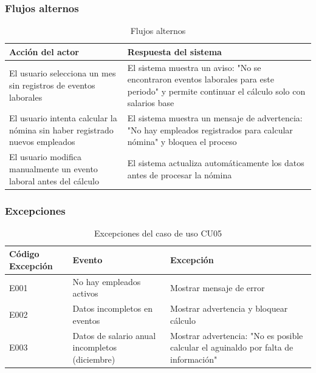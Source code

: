\subsubsection*{Flujos alternos}

\begin{table}[h]
	\centering
	\caption{Flujos alternos}
	\begin{tabular}{|p{7cm}|p{7cm}|}
		\hline
		\textbf{Acción del actor}                                                   & \textbf{Respuesta del sistema}                                                                                                             \\ \hline
		El usuario selecciona un mes sin registros de eventos laborales             & El sistema muestra un aviso: "No se encontraron eventos laborales para este periodo" y permite continuar el cálculo solo con salarios base \\ \hline
		El usuario intenta calcular la nómina sin haber registrado nuevos empleados & El sistema muestra un mensaje de advertencia: "No hay empleados registrados para calcular nómina" y bloquea el proceso                     \\ \hline
		El usuario modifica manualmente un evento laboral antes del cálculo         & El sistema actualiza automáticamente los datos antes de procesar la nómina                                                                 \\ \hline
	\end{tabular}
\end{table}

\clearpage

\subsubsection*{Excepciones}

\begin{table}[h]
	\centering
	\caption{Excepciones del caso de uso CU05}
	\begin{tabular}{|p{4cm}|p{6cm}|p{6cm}|}
		\hline
		\textbf{Código Excepción} & \textbf{Evento}              & \textbf{Excepción}                                                                 \\ \hline
		E001                      & No hay empleados activos     & Mostrar mensaje de error                                                           \\ \hline
		E002                      & Datos incompletos en eventos & Mostrar advertencia y bloquear cálculo                                             \\ \hline
		E003                      & Datos de salario anual incompletos (diciembre) & Mostrar advertencia: "No es posible calcular el aguinaldo por falta de información" \\ \hline
	\end{tabular}
\end{table}


